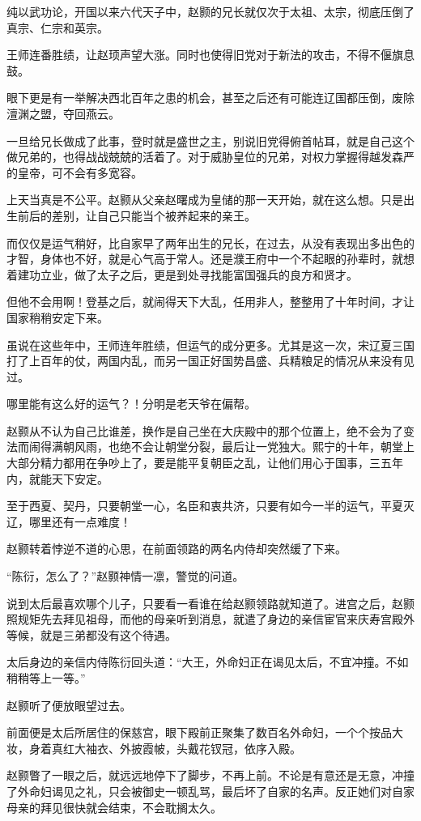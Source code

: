 纯以武功论，开国以来六代天子中，赵颢的兄长就仅次于太祖、太宗，彻底压倒了真宗、仁宗和英宗。

王师连番胜绩，让赵顼声望大涨。同时也使得旧党对于新法的攻击，不得不偃旗息鼓。

眼下更是有一举解决西北百年之患的机会，甚至之后还有可能连辽国都压倒，废除澶渊之盟，夺回燕云。

一旦给兄长做成了此事，登时就是盛世之主，别说旧党得俯首帖耳，就是自己这个做兄弟的，也得战战兢兢的活着了。对于威胁皇位的兄弟，对权力掌握得越发森严的皇帝，可不会有多宽容。

上天当真是不公平。赵颢从父亲赵曙成为皇储的那一天开始，就在这么想。只是出生前后的差别，让自己只能当个被养起来的亲王。

而仅仅是运气稍好，比自家早了两年出生的兄长，在过去，从没有表现出多出色的才智，身体也不好，就是心气高于常人。还是濮王府中一个不起眼的孙辈时，就想着建功立业，做了太子之后，更是到处寻找能富国强兵的良方和贤才。

但他不会用啊！登基之后，就闹得天下大乱，任用非人，整整用了十年时间，才让国家稍稍安定下来。

虽说在这些年中，王师连年胜绩，但运气的成分更多。尤其是这一次，宋辽夏三国打了上百年的仗，两国内乱，而另一国正好国势昌盛、兵精粮足的情况从来没有见过。

哪里能有这么好的运气？！分明是老天爷在偏帮。

赵颢从不认为自己比谁差，换作是自己坐在大庆殿中的那个位置上，绝不会为了变法而闹得满朝风雨，也绝不会让朝堂分裂，最后让一党独大。熙宁的十年，朝堂上大部分精力都用在争吵上了，要是能平复朝臣之乱，让他们用心于国事，三五年内，就能天下安定。

至于西夏、契丹，只要朝堂一心，名臣和衷共济，只要有如今一半的运气，平夏灭辽，哪里还有一点难度！

赵颢转着悖逆不道的心思，在前面领路的两名内侍却突然缓了下来。

“陈衍，怎么了？”赵颢神情一凛，警觉的问道。

说到太后最喜欢哪个儿子，只要看一看谁在给赵颢领路就知道了。进宫之后，赵颢照规矩先去拜见祖母，而他的母亲听到消息，就遣了身边的亲信宦官来庆寿宫殿外等候，就是三弟都没有这个待遇。

太后身边的亲信内侍陈衍回头道：“大王，外命妇正在谒见太后，不宜冲撞。不如稍稍等上一等。”

赵颢听了便放眼望过去。

前面便是太后所居住的保慈宫，眼下殿前正聚集了数百名外命妇，一个个按品大妆，身着真红大袖衣、外披霞帔，头戴花钗冠，依序入殿。

赵颢瞥了一眼之后，就远远地停下了脚步，不再上前。不论是有意还是无意，冲撞了外命妇谒见之礼，只会被御史一顿乱骂，最后坏了自家的名声。反正她们对自家母亲的拜见很快就会结束，不会耽搁太久。

